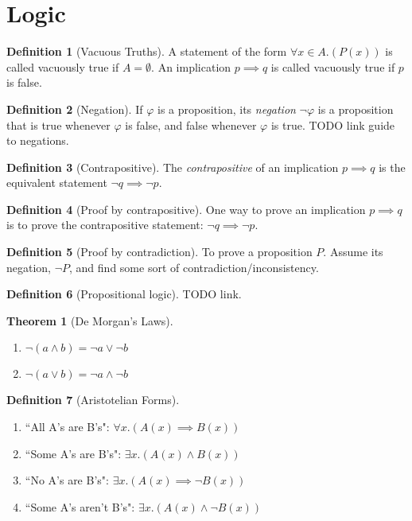 \documentclass[12pt]{article}
\newtheorem{theorem}{Theorem}[section]
\theoremstyle{definition}
\newtheorem{definition}{Definition}[section]
\begin{document}
\section{Logic}
\begin{definition}[Vacuous Truths]
    A statement of the form $\forall x \in A. (P(x))$ is called vacuously true if $A = \emptyset$. An implication $p \implies q$ is called vacuously true if $p$ is false.
\end{definition}

\begin{definition}[Negation]
    If $\varphi$ is a proposition, its \emph{negation} $\neg \varphi$ is a proposition that is true whenever $\varphi$ is false, and false whenever $\varphi$ is true. TODO link guide to negations.
\end{definition}
\begin{definition}[Contrapositive]
    The \emph{contrapositive} of an implication $p \implies q$ is the equivalent statement $\neg q \implies \neg p$.
\end{definition}
\begin{definition}[Proof by contrapositive]
    One way to prove an implication $p \implies q$ is to prove the contrapositive statement: $\neg q \implies \neg p$.
\end{definition}
\begin{definition}[Proof by contradiction]
    To prove a proposition $P$. Assume its negation, $\neg P$, and find some sort of contradiction/inconsistency.
\end{definition}
\begin{definition}[Propositional logic]
    TODO link.
\end{definition}
\begin{theorem}[De Morgan's Laws]
    \begin{enumerate}
        \item $\neg(a \land b) = \neg a \lor \neg b$
        \item $\neg(a \lor b) = \neg a \land \neg b$
    \end{enumerate}
\end{theorem}
\begin{definition}[Aristotelian Forms]
    \begin{enumerate}
        \item ``All A's are B's": $\forall x. (A(x) \implies B(x))$
        \item ``Some A's are B's": $\exists x. (A(x) \land B(x))$
        \item ``No A's are B's": $\exists x. (A(x) \implies \neg B(x))$
        \item ``Some A's aren't B's": $\exists x. (A(x) \land \neg B(x))$
    \end{enumerate}
\end{definition}
\end{document}
